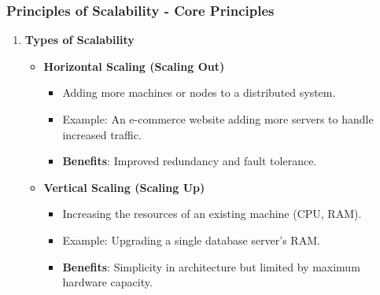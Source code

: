 \documentclass[aspectratio=169]{beamer}
\begin{document}
\begin{frame}[fragile]
    \frametitle{Principles of Scalability - Core Principles}
    \begin{enumerate}
        \item \textbf{Types of Scalability}
        \begin{itemize}
            \item \textbf{Horizontal Scaling (Scaling Out)}
            \begin{itemize}
                \item Adding more machines or nodes to a distributed system.
                \item Example: An e-commerce website adding more servers to handle increased traffic.
                \item \textbf{Benefits}: Improved redundancy and fault tolerance.
            \end{itemize}
            \item \textbf{Vertical Scaling (Scaling Up)}
            \begin{itemize}
                \item Increasing the resources of an existing machine (CPU, RAM).
                \item Example: Upgrading a single database server's RAM.
                \item \textbf{Benefits}: Simplicity in architecture but limited by maximum hardware capacity.
            \end{itemize}
        \end{itemize}
    \end{enumerate}
\end{frame}
\end{document}
